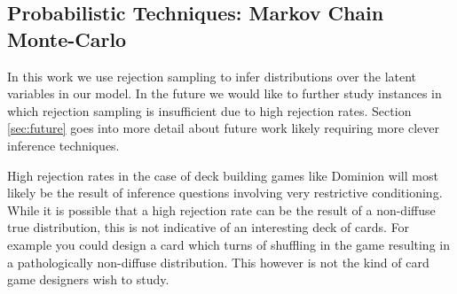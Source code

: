 


\subsection{Probabilistic Techniques: Markov Chain Monte-Carlo} \label{sec:mcmc}


In this work we use rejection sampling to infer distributions over the
latent variables in our model.
In the future we would like to further study instances in which rejection
sampling is insufficient due to high rejection rates. Section
\ref{sec:future} goes into more detail about future work likely requiring
more clever inference techniques.

High rejection rates
in the case of deck building games like Dominion will most likely be the
result of inference questions involving very restrictive conditioning.
While it is possible that a high rejection rate can be the result of
a non-diffuse true distribution, this is not indicative of an interesting
deck of cards. For example you could design a card which turns
of shuffling in the game resulting in a pathologically non-diffuse distribution.
This however is not the kind of card game designers wish to study.


